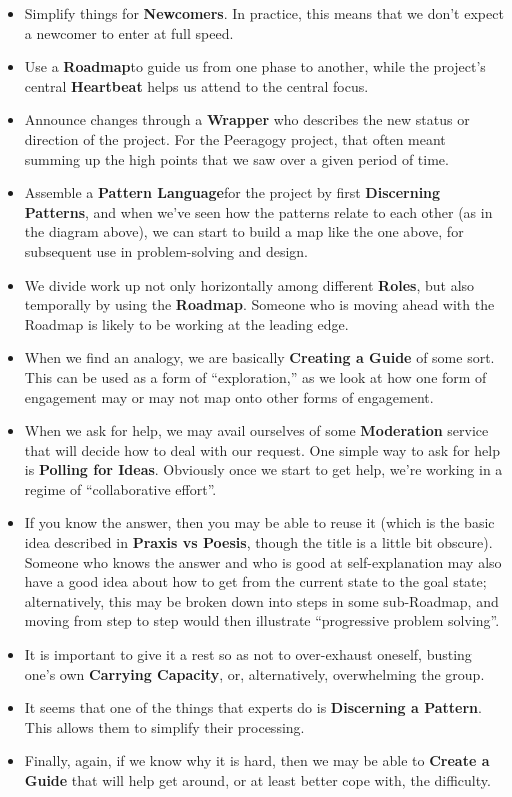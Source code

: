 \begin{itemize}
\item
  Simplify things for \textbf{Newcomers}. In practice, this means that
  we don't expect a newcomer to enter at full speed.
\item
  Use a \textbf{Roadmap}to guide us from one phase to another, while the
  project's central \textbf{Heartbeat} helps us attend to the central
  focus.
\item
  Announce changes through a \textbf{Wrapper} who describes the new
  status or direction of the project. For the Peeragogy project, that
  often meant summing up the high points that we saw over a given period
  of time.
\item
  Assemble a \textbf{Pattern Language}for the project by first
  \textbf{Discerning Patterns}, and when we've seen how the patterns
  relate to each other (as in the diagram above), we can start to build
  a map like the one above, for subsequent use in problem-solving and
  design.
\item
  We divide work up not only horizontally among different
  \textbf{Roles}, but also temporally by using the \textbf{Roadmap}.
  Someone who is moving ahead with the Roadmap is likely to be working
  at the leading edge.
\item
  When we find an analogy, we are basically \textbf{Creating a Guide} of
  some sort. This can be used as a form of ``exploration,'' as we look
  at how one form of engagement may or may not map onto other forms of
  engagement.
\item
  When we ask for help, we may avail ourselves of some
  \textbf{Moderation} service that will decide how to deal with our
  request. One simple way to ask for help is \textbf{Polling for Ideas}.
  Obviously once we start to get help, we're working in a regime of
  ``collaborative effort''.
\item
  If you know the answer, then you may be able to reuse it (which is the
  basic idea described in \textbf{Praxis vs Poesis}, though the title is
  a little bit obscure). Someone who knows the answer and who is good at
  self-explanation may also have a good idea about how to get from the
  current state to the goal state; alternatively, this may be broken
  down into steps in some sub-Roadmap, and moving from step to step
  would then illustrate ``progressive problem solving''.
\item
  It is important to give it a rest so as not to over-exhaust oneself,
  busting one's own \textbf{Carrying Capacity}, or, alternatively,
  overwhelming the group.
\item
  It seems that one of the things that experts do is \textbf{Discerning
  a Pattern}. This allows them to simplify their processing.
\item
  Finally, again, if we know why it is hard, then we may be able to
  \textbf{Create a Guide} that will help get around, or at least better
  cope with, the difficulty.
\end{itemize}
